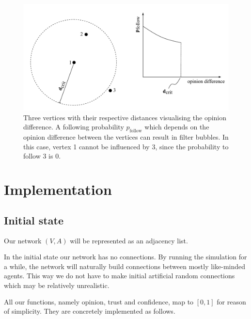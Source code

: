 \documentclass[11pt]{article}
\begin{document}
    

\begin{figure}[H]
    \centering
    \includegraphics[width = .6\linewidth]{img/p_follow_visual.pdf}
    
    \caption{Three vertices with their respective distances visualising the opinion difference. A following probability $p_\mathrm{follow}$ which depends on the opinion difference between the vertices can result in filter bubbles. In this case, vertex 1 cannot be influenced by 3, since the probability to follow 3 is 0.}
    \label{fig:p_follow}
\end{figure}

\section{Implementation}\label{sec:implementation}
\subsection{Initial state}
Our network \((V, A)\) will be represented as an adjacency list.\par
In the initial state our network has no connections. By running the simulation for a while, the network will naturally build connections between mostly like-minded agents. This way we do not have to make initial artificial random connections which may be relatively unrealistic.\par
All our functions, namely opinion, trust and confidence, map to \([0,1]\) for reason of simplicity. They are concretely implemented as follows.
\end{document}
